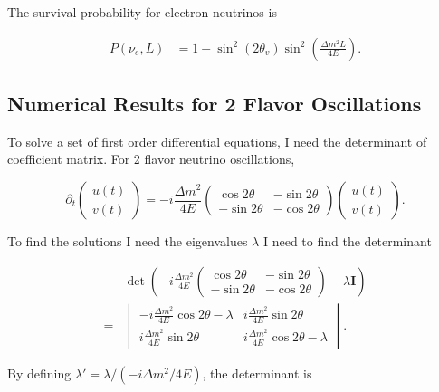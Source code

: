 \documentclass{tufte-handout}
\begin{document}
The survival probability for electron neutrinos is

\begin{align*}
P(\nu_e,L) &= 1-\sin^2(2\theta_v)\sin^2\left( \frac{\Delta m^2 L}{4E} \right) .
\end{align*}






\subsection{Numerical Results for 2 Flavor Oscillations}


To solve a set of first order differential equations, I need the determinant of coefficient matrix. For 2 flavor neutrino oscillations,

\begin{equation*}
\partial_t \begin{pmatrix}
u(t) \\ v(t)
\end{pmatrix} = - i \frac{\Delta m^2}{4E} \begin{pmatrix}
\cos 2\theta &  -  \sin 2\theta \\  - \sin 2\theta & - \cos 2\theta
\end{pmatrix} \begin{pmatrix}
u(t) \\ v(t)
\end{pmatrix}.
\end{equation*}

To find the solutions I need the eigenvalues $\lambda$ I need to find the determinant

\begin{align*}
&\det \left( - i\frac{\Delta m^2}{4E} \begin{pmatrix}
\cos 2\theta &  -  \sin 2\theta \\  - \sin 2\theta & - \cos 2\theta
\end{pmatrix} - \lambda \mathbf{I} \right) \\
=& \begin{vmatrix}
-i \frac{\Delta m^2}{4E} \cos 2\theta - \lambda & i \frac{\Delta m^2}{4E} \sin 2\theta \\
i \frac{\Delta m^2}{4E} \sin 2\theta & i \frac{\Delta m^2}{4E} \cos 2\theta - \lambda
\end{vmatrix} .
\end{align*}

By defining $\lambda' = \lambda/(-i \Delta m^2 / 4E)$, the determinant is
\end{document}
